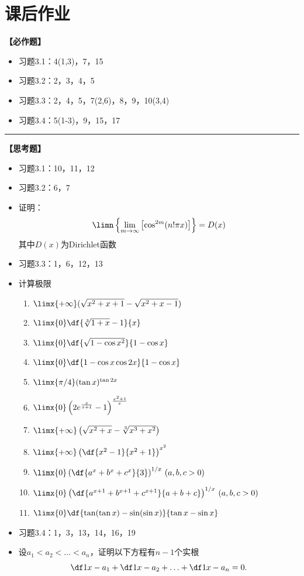 \section*{课后作业}

{\bf 【必作题】}

\begin{itemize}
  \item 习题3.1：4(1,3)，7，15
  \item 习题3.2：2，3，4，5
  \item 习题3.3：2，4，5，7(2,6)，8，9，10(3,4)
  \item 习题3.4：5(1-3)，9，15，17
\end{itemize}

\bigskip

\hrule

\bigskip
\bigskip

{\bf 【思考题】}
\begin{itemize}
  \item 习题3.1：10，11，12
  \item 习题3.2：6，7
  \item 证明：$$\limn\left\{\lim\limits_{m\to\infty}\left[\cos^{2m}(n!\pi
	x)\right]\right\}=D(x)$$
	其中$D(x)$为Dirichlet函数
  \item 习题3.3：1，6，12，13
  \item  计算极限
	\begin{enumerate}[(1)]
	  \item $\limx{+\infty}(\sqrt{x^2+x+1}-\sqrt{x^2+x-1})$ 
	  \item $\limx{0}\df{\sqrt[3]{1+x}-1}{x}$ 
	  \item $\limx{0}\df{\sqrt{1-\cos x^2}}{1-\cos x}$ 
	  \item $\limx{0}\df{1-\cos x\cos 2x}{1-\cos x}$
	  \item $\limx{\pi /4}(\tan x)^{\tan 2x}$ 
	  \item $\limx{0}\left(2e^{\frac{x}{x+1}}-1\right)^{\frac{x^2+1}{x}}$ 
	  \item $\limx{+\infty}\left(\sqrt{x^2+x}-\sqrt[3]{x^3+x^2}\right)
		$ 
	  \item $\limx{+\infty}\left(\df{x^2-1}{x^2+1}\right)^{x^2}$
	  \item $\limx{0}\left(\df{a^x+b^x+c^x}{3}\right)^{1/x}\,(a,b,c>0)$ 
	  \item $\limx{0}\left(\df{a^{x+1}+b^{x+1}+c^{x+1}}{a+b+c}\right)^{1/x}
	  \,(a,b,c>0)$ 
	  \item $\limx{0}\df{\tan(\tan x)-\sin(\sin x)}{\tan x-\sin x}$
	\end{enumerate}
  \item 习题3.4：1，3，13，14，16，19
  \item 设$a_1<a_2<\ldots<a_n$，证明以下方程有$n-1$个实根
	$$\df 1{x-a_1}+\df 1{x-a_2}+\ldots+\df 1{x-a_n}=0.$$
\end{itemize}

\newpage


